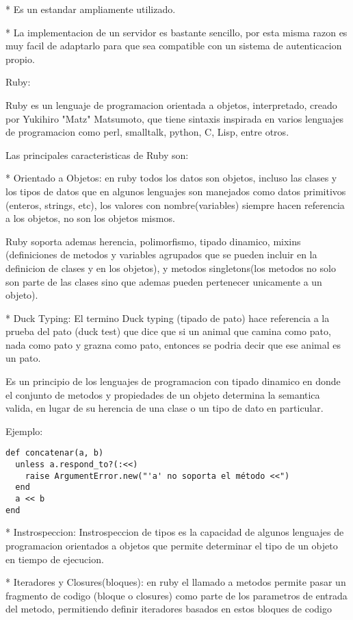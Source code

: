 * Es un estandar ampliamente utilizado.

* La implementacion de un servidor es bastante sencillo, por esta misma razon es muy facil de adaptarlo para que sea compatible con un sistema de autenticacion propio.



Ruby:

Ruby es un lenguaje de programacion orientada a objetos, interpretado, creado por Yukihiro "Matz" Matsumoto, que tiene sintaxis inspirada en varios lenguajes de programacion como perl, smalltalk, python, C, Lisp, entre otros.

Las principales caracteristicas de Ruby son:

* Orientado a Objetos: en ruby todos los datos son objetos, incluso las clases y los tipos de datos que en algunos lenguajes son manejados como datos primitivos (enteros, strings, etc), los valores con nombre(variables) siempre hacen referencia a los objetos, no son los objetos mismos.

Ruby soporta ademas herencia, polimorfismo, tipado dinamico, mixins (definiciones de metodos y variables agrupados que se pueden incluir en la definicion de clases y en los objetos), y metodos singletons(los metodos no solo son parte de las clases sino que ademas pueden pertenecer unicamente a un objeto).

* Duck Typing: El termino Duck typing (tipado de pato) hace referencia a la prueba del pato (duck test) que dice que si un animal que camina como pato, nada como pato y grazna como pato, entonces se podria decir que ese animal es un pato.

Es un principio de los lenguajes de programacion con tipado dinamico en donde el conjunto de metodos y propiedades de un objeto determina la semantica valida, en lugar de su herencia de una clase o un tipo de dato en particular.

Ejemplo:

\begin{verbatim}
def concatenar(a, b)
  unless a.respond_to?(:<<)
    raise ArgumentError.new("'a' no soporta el método <<")
  end
  a << b
end
\end{verbatim}

* Instrospeccion: Instrospeccion de tipos es la capacidad de algunos lenguajes de programacion orientados a objetos que permite determinar el tipo de un objeto en tiempo de ejecucion.

* Iteradores y Closures(bloques): en ruby el llamado a metodos permite pasar un fragmento de codigo (bloque o closures) como parte de los parametros de entrada del metodo, permitiendo definir iteradores basados en estos bloques de codigo

